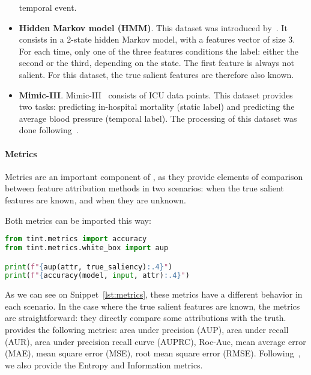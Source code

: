 \begin{itemize}
        temporal event.
    \item \textbf{Hidden Markov model (HMM)}.
        This dataset was introduced by~\citep{crabbe2021explaining}.
        It consists in a 2-state hidden Markov model, with a features vector of size 3.
        For each time, only one of the three features conditions the label: either the second or the third, depending
        on the state.
        The first feature is always not salient.
        For this dataset, the true salient features are therefore also known.
    \item \textbf{Mimic-III}.
        Mimic-III~\citep{johnson2016mimic} consists of ICU data points.
        This dataset provides two tasks: predicting in-hospital mortality (static label) and predicting the
        average blood pressure (temporal label).
        The processing of this dataset was done following~\citep{tonekaboni2020went, crabbe2021explaining}.
\end{itemize}


\paragraph{Metrics}

Metrics are an important component of \texttt{}, as they provide elements of comparison
between feature attribution methods in two scenarios: when the true salient features are known, and when they are
unknown.

Both metrics can be imported this way:

\begin{lstlisting}[language=Python, caption=Attribution evaluation example, label={lst:metrics}]
from tint.metrics import accuracy
from tint.metrics.white_box import aup

print(f"{aup(attr, true_saliency):.4}")
print(f"{accuracy(model, input, attr):.4}")
\end{lstlisting}

As we can see on Snippet~\ref{lst:metrics}, these metrics have a different behavior in each scenario.
In the case where the true salient features are known, the metrics are straightforward: they directly compare some
attributions with the truth.
\texttt{} provides the following metrics: area under precision (AUP), area under recall (AUR),
area under precision recall curve (AUPRC), Roc-Auc, mean average error (MAE), mean square error (MSE), root mean square
error (RMSE).
Following~\citep{crabbe2021explaining}, we also provide the Entropy and Information metrics.

